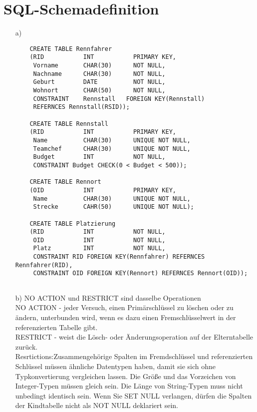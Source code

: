 \documentclass[ngerman]{gdb-aufgabenblatt}
\begin{document}
\section{SQL-Schemadefinition}
\begin{enumerate}
	\item[a)] 
	\begin{verbatim}
	CREATE TABLE Rennfahrer 
	(RID           INT           PRIMARY KEY,
	 Vorname       CHAR(30)      NOT NULL,
	 Nachname      CHAR(30)      NOT NULL,
	 Geburt        DATE          NOT NULL,
	 Wohnort       CHAR(50)      NOT NULL,
	 CONSTRAINT    Rennstall   FOREIGN KEY(Rennstall) 
	 REFERNCES Rennstall(RSID));
	 
	CREATE TABLE Rennstall
	(RID           INT           PRIMARY KEY,
	 Name          CHAR(30)      UNIQUE NOT NULL,
	 Teamchef      CHAR(30)      UNIQUE NOT NULL,
	 Budget        INT           NOT NULL,
	 CONSTRAINT Budget CHECK(0 < Budget < 500));
	 
	CREATE TABLE Rennort
	(OID           INT           PRIMARY KEY,
	 Name          CHAR(30)      UNIQUE NOT NULL, 
	 Strecke       CAHR(50)      UNIQUE NOT NULL);
	   
	CREATE TABLE Platzierung
	(RID           INT           NOT NULL,           
	 OID           INT           NOT NULL,
	 Platz         INT           NOT NULL,
	 CONSTRAINT RID FOREIGN KEY(Rennfahrer) REFERNCES Rennfahrer(RID),
	 CONSTRAINT OID FOREIGN KEY(Rennort) REFERNCES Rennort(OID));
	   	   	
	\end{verbatim}
	\item[b)] NO ACTION und RESTRICT sind dasselbe Operationen\\
			  NO ACTION - jeder Versuch, einen Primärschlüssel zu löschen oder zu ändern, unterbunden wird, wenn es dazu einen Fremschlüsselwert in der referenzierten Tabelle gibt.\\
			  RESTRICT - weist die Lösch- oder Änderungsoperation auf der Elterntabelle zurück.\\
	          Resrtictions:Zusammengehörige Spalten im Fremdschlüssel und referenzierten Schlüssel müssen ähnliche Datentypen haben, damit sie sich ohne Typkonvertierung vergleichen lassen. Die Größe und das Vorzeichen von Integer-Typen müssen gleich sein. Die Länge von String-Typen muss nicht unbedingt identisch sein. Wenn Sie SET NULL verlangen, dürfen die Spalten der Kindtabelle nicht als NOT NULL deklariert sein.\\
	          

\end{enumerate}
\end{document}
